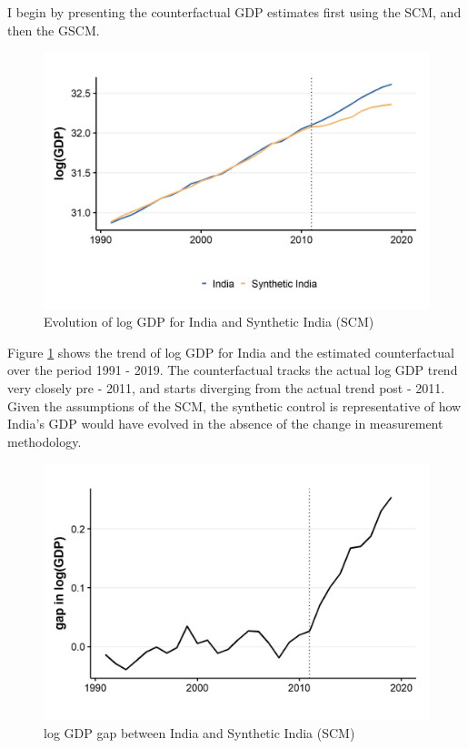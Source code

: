 \documentclass[12pt,nobind, a4paper]{reedthesis}
\begin{document}
 I begin by presenting the counterfactual GDP estimates first using the SCM, and then the GSCM.
 \begin{figure}

 {\centering \includegraphics[width=1\linewidth]{figure/indiasynth} 

 }

 \caption{Evolution of log GDP for India and Synthetic India (SCM)}\label{fig:indsyn}
 \end{figure}
 Figure \ref{fig:indsyn} shows the trend of log GDP for India and the estimated counterfactual over the period 1991 - 2019. The counterfactual tracks the actual log GDP trend very closely pre - 2011, and starts diverging from the actual trend post - 2011. Given the assumptions of the SCM, the synthetic control is representative of how India's GDP would have evolved in the absence of the change in measurement methodology.
 \newpage
 \begin{figure}

 {\centering \includegraphics[width=1\linewidth]{figure/indiasynthgap} 

 }

 \caption{log GDP gap between India and Synthetic India (SCM)}\label{fig:indsyngap}
 \end{figure}
\end{document}
